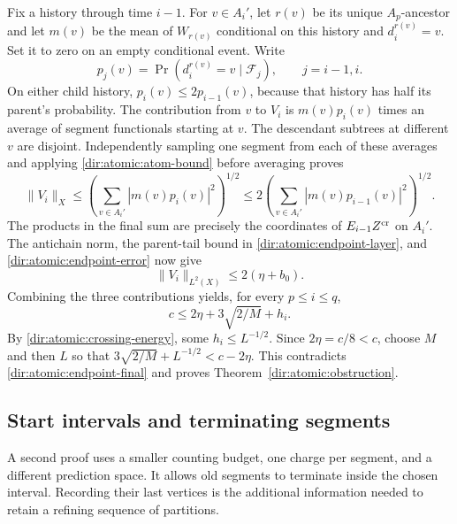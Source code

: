 Fix a history through time $i-1$.  For $v\in A_i'$, let $r(v)$ be its
unique $A_p$-ancestor and let $m(v)$ be the mean of $W_{r(v)}$
conditional on this history and $d_i^{r(v)}=v$.  Set it to zero on an
empty conditional event.  Write
\[
 p_j(v)=\Pr(d_i^{r(v)}=v\mid\mathcal F_j),\qquad j=i-1,i.
\]
On either child history, $p_i(v)\le2p_{i-1}(v)$, because that history
has half its parent's probability.  The contribution from $v$ to $V_i$
is $m(v)p_i(v)$ times an average of segment functionals starting at $v$.
The descendant subtrees at different $v$ are disjoint.  Independently
sampling one segment from each of these averages and applying
\eqref{dir:atomic:atom-bound} before averaging proves
\[
 \|V_i\|_X\le
 \left(\sum_{v\in A_i'}|m(v)p_i(v)|^2\right)^{1/2}
 \le2\left(\sum_{v\in A_i'}|m(v)p_{i-1}(v)|^2\right)^{1/2}.
\]
The products in the final sum are precisely the coordinates of
$E_{i-1}Z^{\rm cr}$ on $A_i'$.  The antichain norm, the parent-tail
bound in \eqref{dir:atomic:endpoint-layer}, and
\eqref{dir:atomic:endpoint-error} now give
\[
 \|V_i\|_{L^2(X)}\le2(\eta+b_0).
\]
Combining the three contributions yields, for every $p\le i\le q$,
\begin{equation}\label{dir:atomic:endpoint-final}
 c\le2\eta+3\sqrt{2/M}+h_i.
\end{equation}
By \eqref{dir:atomic:crossing-energy}, some $h_i\le L^{-1/2}$.
Since $2\eta=c/8<c$, choose $M$ and then $L$ so that
$3\sqrt{2/M}+L^{-1/2}<c-2\eta$.  This contradicts
\eqref{dir:atomic:endpoint-final} and proves
Theorem~\ref{dir:atomic:obstruction}.

\subsection{Start intervals and terminating segments}
\label{dir:atomic:status-route}

A second proof uses a smaller counting budget, one charge per segment,
and a different prediction space.  It allows old segments to terminate
inside the chosen interval.  Recording their last vertices is the
additional information needed to retain a refining sequence of
partitions.

